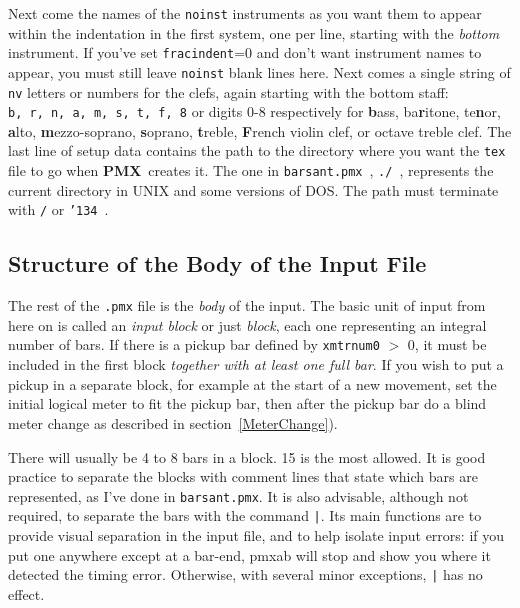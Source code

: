 \documentclass[11pt]{article}
\def\bs{{\tt\char'134}}
\newcommand\PMXX{\textbf{PMX}}
\newcommand\PMX{\PMXX~}
\def\newfrom{2.59}  %
\def\NEW#1{\ifdim#1 pt<\newfrom pt\else%
\marginpar{\fbox{#1}}\fi}
\begin{document}
Next come the names of the {\tt noinst} instruments as you want them to 
appear within the indentation in the first system, one per line, 
starting with the {\it bottom} instrument.  If you've set {\tt fracindent}=0 
and don't 
want instrument names to appear, you must still leave {\tt noinst}
blank lines here.  Next comes a single string of {\tt nv} 
letters or numbers for the clefs, again starting with the bottom staff: 
\label{ClefCodes}
{\tt b,~r,~n,~a,~m,~s,~t,~f,~8} or digits 0-8 \NEW{2.71} respectively for {\bf b}ass, 
ba{\bf r}itone, te{\bf n}or, {\bf a}lto, {\bf m}ezzo-soprano, {\bf s}oprano, 
{\bf t}reble,\NEW{2.2} {\bf F}rench violin clef, or octave treble clef.   
The last line of setup data contains the path to the directory 
where you want the {\tt tex} file to go when \PMX creates it.  The one 
in {\tt barsant.pmx}~, 
{\tt ./}~, represents the current directory in UNIX and some versions of DOS.  
The path must terminate with {\tt /} or {\tt \bs}~.

\subsection{Structure of the Body of the Input File} \label{structure}

	The rest of the {\tt .pmx} file is the {\it body} of the input.  
The basic unit of input from here on is called an {\it input block} or 
just {\it block}, each one representing an integral number of bars.  If there
is a pickup bar defined by {\tt xmtrnum0} $>$ 0, 
it must be included in the first block {\it together with at least one full bar}. 
If you wish to put a pickup in a separate block, for example at the start
of a new movement, set the initial logical
meter to fit the pickup bar, then after the pickup bar do a blind meter change
as described in section~\ref{MeterChange}).

There will usually be 
4 to 8 bars in a block.  15 is the most allowed.  It is good practice 
to separate the blocks with comment lines that state which bars are 
represented, as I've done in {\tt barsant.pmx}.  
It is also advisable, although not required, to separate the bars with
the command {\tt |}. Its main functions 
are to provide visual separation in the input file, and to help isolate input
errors: if you put one anywhere except 
at a bar-end, {\bfx pmxab} will stop and show you where it detected the 
timing error. Otherwise, with several minor exceptions,
{\tt |} has no effect.  
\end{document}
